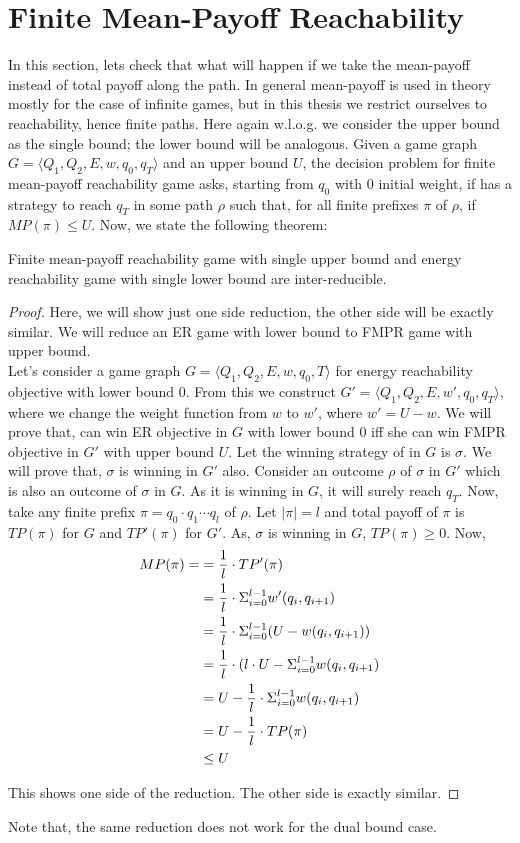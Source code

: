 \section{Finite Mean-Payoff Reachability}
In this section, lets check that what will happen if we take the mean-payoff instead of total payoff along the path. In general mean-payoff is used in theory mostly for the case of infinite games, but in this thesis we restrict ourselves to reachability, hence finite paths.
\vskip 0.3cm
Here again w.l.o.g. we consider the upper bound as the single bound; the lower bound will be analogous. Given a game graph $G=\langle Q_1, Q_2, E, w, q_0,q_T\rangle$ and an upper bound $U$, the decision problem for finite mean-payoff reachability game asks, starting from $q_0$ with 0 initial weight, if  has a strategy to reach $q_T$ in some path $\rho$ such that, for all finite prefixes $\pi$ of $\rho$, if $MP(\pi) \leq U$. Now, we state the following theorem:
\begin{theorem}
Finite mean-payoff reachability game with single upper bound and 
energy reachability game with single lower bound are inter-reducible.
\end{theorem}
\vskip 0.2cm
\begin{proof}
Here, we will show just one side reduction, the other side will be exactly similar. We will reduce an ER game with lower bound to FMPR game with upper bound. \\
Let's consider a game graph $G=\langle Q_1, Q_2, E, w, q_0,T\rangle$ for energy reachability objective with lower bound $0$. From this we construct $G'=\langle Q_1, Q_2, E, w', q_0,q_T\rangle$, where we change the weight function from $w$ to $w'$, where $w'= U-w$. We will prove that,  can win ER objective in $G$ with lower bound $0$ iff she can win FMPR objective in $G'$ with upper bound $U$.
\vskip 0.1cm
Let the winning strategy of  in $G$ is $\sigma$. We will prove that, $\sigma$ is winning in $G'$ also. Consider an outcome $\rho$ of $\sigma$ in $G'$ which is also an outcome of $\sigma$ in $G$. As it is winning in $G$, it will surely reach $q_T$. Now, take any finite prefix $\pi = q_0 \cdot q_1 \cdots q_l$ of $\rho$. Let $|\pi|=l$ and total payoff of $\pi$ is $TP(\pi)$ for $G$ and $TP'(\pi)$ for $G'$. As, $\sigma$ is winning in $G$, $TP(\pi) \geq 0$. Now,
\begin{align*}
\notag
\centering
MP(\pi)=
&= \frac{1}{l} \cdot TP'(\pi)\\
&= \frac{1}{l} \cdot \Sigma_{i=0}^{l-1} w^{\prime}(q_i,q_{i+1})\\
&=\frac{1}{l} \cdot \Sigma_{i=0}^{l-1} (U- w(q_i,q_{i+1}))\\
&=\frac{1}{l} \cdot (l\cdot U - \Sigma_{i=0}^{l-1} w(q_i,q_{i+1})\\
&=U - \frac{1}{l} \cdot \Sigma_{i=0}^{l-1} w(q_i,q_{i+1})\\
&=U - \frac{1}{l} \cdot TP(\pi)\\
& \leq U
\end{align*}

This shows one side of the reduction. The other side is exactly similar.
\end{proof}
\vskip 0.3cm
Note that, the same reduction does not work for the dual bound case. 
 
